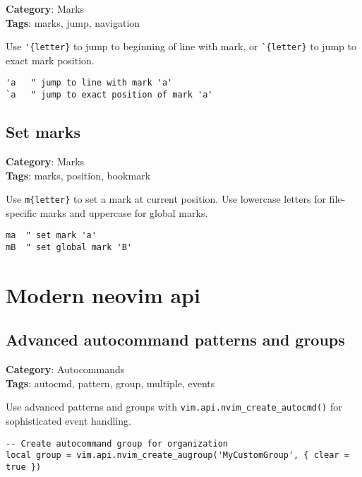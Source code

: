 {{{{{{\textbf{Category}: Marks\\ \textbf{Tags}: marks, jump, navigation
\vspace{0.5cm}

Use {\footnotesize \Verb§'{letter}§} to jump to beginning of line with mark, or {\footnotesize \Verb§`{letter}§} to jump to exact mark position.

\begin{Exa*}{}
\begin{Verbatim}[fontsize=\footnotesize, breaklines, breakanywhere]
'a   " jump to line with mark 'a'
`a   " jump to exact position of mark 'a'
\end{Verbatim}
\end{Exa*}

\section{Set marks}

\textbf{Category}: Marks\\ \textbf{Tags}: marks, position, bookmark
\vspace{0.5cm}

Use {\footnotesize \Verb§m{letter}§} to set a mark at current position. Use lowercase letters for file-specific marks and uppercase for global marks.

\begin{Exa*}{}
\begin{Verbatim}[fontsize=\footnotesize, breaklines, breakanywhere]
ma  " set mark 'a'
mB  " set global mark 'B'
\end{Verbatim}
\end{Exa*}

\chapter{Modern neovim api}
\section{Advanced autocommand patterns and groups}

\textbf{Category}: Autocommands\\ \textbf{Tags}: autocmd, pattern, group, multiple, events
\vspace{0.5cm}

Use advanced patterns and groups with {\footnotesize \Verb§vim.api.nvim_create_autocmd()§} for sophisticated event handling.

\begin{Exa*}{}
\begin{Verbatim}[fontsize=\footnotesize, breaklines, breakanywhere]
-- Create autocommand group for organization
local group = vim.api.nvim_create_augroup('MyCustomGroup', { clear = true })


\end{Verbatim}
\end{Exa*}}}}}}}
